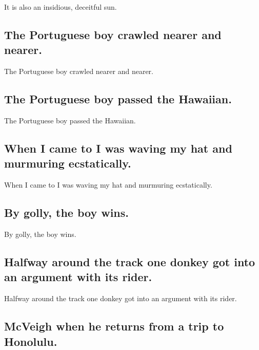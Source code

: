 \documentclass[]{article}
\begin{document}
It is also an insidious, deceitful sun.

\hypertarget{the-portuguese-boy-crawled-nearer-and-nearer.}{%
\subsection{The Portuguese boy crawled nearer and
nearer.}\label{the-portuguese-boy-crawled-nearer-and-nearer.}}

The Portuguese boy crawled nearer and nearer.

\hypertarget{the-portuguese-boy-passed-the-hawaiian.}{%
\subsection{The Portuguese boy passed the
Hawaiian.}\label{the-portuguese-boy-passed-the-hawaiian.}}

The Portuguese boy passed the Hawaiian.

\hypertarget{when-i-came-to-i-was-waving-my-hat-and-murmuring-ecstatically.}{%
\subsection{When I came to I was waving my hat and murmuring
ecstatically.}\label{when-i-came-to-i-was-waving-my-hat-and-murmuring-ecstatically.}}

When I came to I was waving my hat and murmuring ecstatically.

\hypertarget{by-golly-the-boy-wins.}{%
\subsection{By golly, the boy wins.}\label{by-golly-the-boy-wins.}}

By golly, the boy wins.

\hypertarget{halfway-around-the-track-one-donkey-got-into-an-argument-with-its-rider.}{%
\subsection{Halfway around the track one donkey got into an argument
with its
rider.}\label{halfway-around-the-track-one-donkey-got-into-an-argument-with-its-rider.}}

Halfway around the track one donkey got into an argument with its rider.

\hypertarget{mcveigh-when-he-returns-from-a-trip-to-honolulu.}{%
\subsection{McVeigh when he returns from a trip to
Honolulu.}\label{mcveigh-when-he-returns-from-a-trip-to-honolulu.}}
\end{document}
